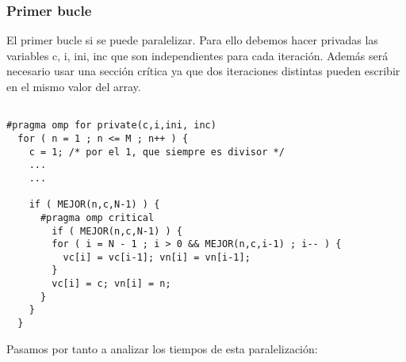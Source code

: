 \documentclass[11pt,oneside,a4paper]{article}
\begin{document}
\subsubsection{Primer bucle}
El primer bucle si se puede paralelizar. Para ello debemos hacer privadas las variables c, i, ini, inc que son independientes para cada iteración. Además será necesario usar una sección crítica  ya que dos iteraciones distintas pueden escribir en el mismo valor del array.
\lstset{language=C, breaklines=true, basicstyle=\footnotesize}
\begin{lstlisting}[frame=single]

#pragma omp for private(c,i,ini, inc)
  for ( n = 1 ; n <= M ; n++ ) {
    c = 1; /* por el 1, que siempre es divisor */
    ...
    ...
    
    if ( MEJOR(n,c,N-1) ) {
      #pragma omp critical
        if ( MEJOR(n,c,N-1) ) {
        for ( i = N - 1 ; i > 0 && MEJOR(n,c,i-1) ; i-- ) {
          vc[i] = vc[i-1]; vn[i] = vn[i-1];
        }
        vc[i] = c; vn[i] = n;
      }
    }
  }
\end{lstlisting}
Pasamos por tanto a analizar los tiempos de esta paralelización:
\end{document}

